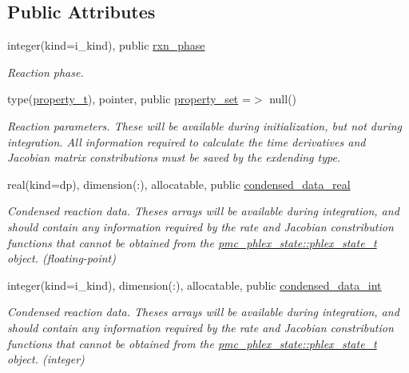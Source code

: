 \subsection*{Public Attributes}
\begin{DoxyCompactItemize}
\item 
integer(kind=i\+\_\+kind), public \mbox{\hyperlink{structpmc__rxn__data_1_1rxn__data__t_a083493c401265afb142cfb7b2799348e}{rxn\+\_\+phase}}
\begin{DoxyCompactList}\small\item\em Reaction phase. \end{DoxyCompactList}\item 
type(\mbox{\hyperlink{structpmc__property_1_1property__t}{property\+\_\+t}}), pointer, public \mbox{\hyperlink{structpmc__rxn__data_1_1rxn__data__t_a1e41bfcf13269629b6b7343d9a377580}{property\+\_\+set}} =$>$ null()
\begin{DoxyCompactList}\small\item\em Reaction parameters. These will be available during initialization, but not during integration. All information required to calculate the time derivatives and Jacobian matrix constributions must be saved by the exdending type. \end{DoxyCompactList}\item 
real(kind=dp), dimension(\+:), allocatable, public \mbox{\hyperlink{structpmc__rxn__data_1_1rxn__data__t_a7aae601ae4392a93f4585e660c2c7d29}{condensed\+\_\+data\+\_\+real}}
\begin{DoxyCompactList}\small\item\em Condensed reaction data. Theses arrays will be available during integration, and should contain any information required by the rate and Jacobian constribution functions that cannot be obtained from the {\ttfamily \mbox{\hyperlink{structpmc__phlex__state_1_1phlex__state__t}{pmc\+\_\+phlex\+\_\+state\+::phlex\+\_\+state\+\_\+t}}} object. (floating-\/point) \end{DoxyCompactList}\item 
integer(kind=i\+\_\+kind), dimension(\+:), allocatable, public \mbox{\hyperlink{structpmc__rxn__data_1_1rxn__data__t_a2109ea36cdccb917c9c4a0eb2e25ce16}{condensed\+\_\+data\+\_\+int}}
\begin{DoxyCompactList}\small\item\em Condensed reaction data. Theses arrays will be available during integration, and should contain any information required by the rate and Jacobian constribution functions that cannot be obtained from the {\ttfamily \mbox{\hyperlink{structpmc__phlex__state_1_1phlex__state__t}{pmc\+\_\+phlex\+\_\+state\+::phlex\+\_\+state\+\_\+t}}} object. (integer) \end{DoxyCompactList}\end{DoxyCompactItemize}

